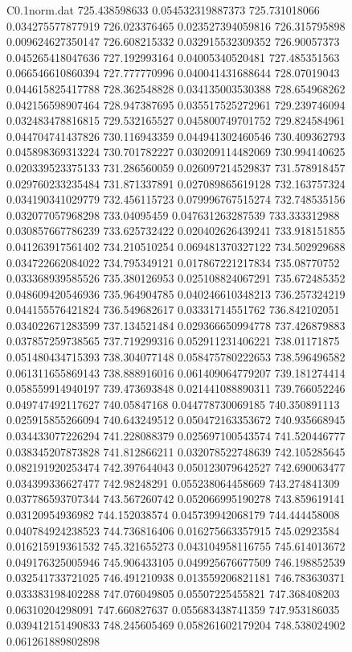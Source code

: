 \begin{filecontents}{C0.1norm.dat}
725.438598633		0.054532319887373
725.731018066		0.034275577877919
726.023376465		0.023527394059816
726.315795898		0.009624627350147
726.608215332		0.032915532309352
726.90057373		0.045265418047636
727.192993164		0.04005340520481
727.485351563		0.066546610860394
727.777770996		0.040041431688644
728.07019043		0.044615825417788
728.362548828		0.034135003530388
728.654968262		0.042156598907464
728.947387695		0.035517525272961
729.239746094		0.032483478816815
729.532165527		0.045800749701752
729.824584961		0.044704741437826
730.116943359		0.044941302460546
730.409362793		0.045898369313224
730.701782227		0.030209114482069
730.994140625		0.020339523375133
731.286560059		0.026097214529837
731.578918457		0.029760233235484
731.871337891		0.027089865619128
732.163757324		0.034190341029779
732.456115723		0.079996767515274
732.748535156		0.032077057968298
733.04095459		0.047631263287539
733.333312988		0.030857667786239
733.625732422		0.020402626439241
733.918151855		0.041263917561402
734.210510254		0.069481370327122
734.502929688		0.034722662084022
734.795349121		0.017867221217834
735.08770752		0.033368939585526
735.380126953		0.025108824067291
735.672485352		0.048609420546936
735.964904785		0.040246610348213
736.257324219		0.044155576421824
736.549682617		0.03331714551762
736.842102051		0.034022671283599
737.134521484		0.029366650994778
737.426879883		0.037857259738565
737.719299316		0.052911231406221
738.01171875		0.051480434715393
738.304077148		0.058475780222653
738.596496582		0.061311655869143
738.888916016		0.061409064779207
739.181274414		0.058559914940197
739.473693848		0.021441088890311
739.766052246		0.049747492117627
740.05847168		0.044778730069185
740.350891113		0.025915855266094
740.643249512		0.050472163353672
740.935668945		0.034433077226294
741.228088379		0.025697100543574
741.520446777		0.038345207873828
741.812866211		0.032078522748639
742.105285645		0.082191920253474
742.397644043		0.050123079642527
742.690063477		0.034399336627477
742.98248291		0.055238064458669
743.274841309		0.037786593707344
743.567260742		0.052066995190278
743.859619141		0.03120954936982
744.152038574		0.045739942068179
744.444458008		0.040784924238523
744.736816406		0.016275663357915
745.02923584		0.016215919361532
745.321655273		0.043104958116755
745.614013672		0.049176325005946
745.906433105		0.049925676677509
746.198852539		0.032541733721025
746.491210938		0.013559206821181
746.783630371		0.033383198402288
747.076049805		0.05507225455821
747.368408203		0.06310204298091
747.660827637		0.055683438741359
747.953186035		0.039412151490833
748.245605469		0.058261602179204
748.538024902		0.061261889802898

\end{filecontents}

